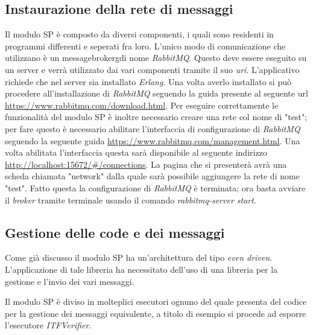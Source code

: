 \subsection{Instaurazione della rete di messaggi}
Il modulo SP è composto da diversi componenti, i quali sono residenti in programmi differenti e seperati fra loro. L'unico modo di comunicazione che utilizzano è un \gls{messagebrokerg}\glsfirstoccur di nome \emph{RabbitMQ}. Questo deve essere eseguito su un server e verrà utilizzato dai vari componenti tramite il suo \emph{uri}.
L'applicativo richiede che nel server sia installato \emph{Erlang}. Una volta averlo installato si può procedere all'installazione di \emph{RabbitMQ} seguendo la guida presente al seguente url \url{https://www.rabbitmq.com/download.html}. Per eseguire correttamente le funzionalità del modulo SP è inoltre necessario creare una rete col nome di "test"; per fare questo è necessario abilitare l'interfaccia di configurazione di \emph{RabbitMQ} seguendo la seguente guida \url{https://www.rabbitmq.com/management.html}.
Una volta abilitata l'interfaccia questa sarà disponibile al seguente indirizzo \url{http://localhost:15672/#/connections}. La pagina che si presenterà avrà una scheda chiamata "network" dalla quale sarà possibile aggiungere la rete di nome "test".
Fatto questa la configurazione di \emph{RabbitMQ} è terminata; ora basta avviare il \emph{broker} tramite terminale usando il comando \emph{rabbitmq-server start}.


\subsection{Gestione delle code e dei messaggi}
Come già discusso il modulo SP ha un'architettura del tipo \emph{even driven}. L'applicazione di tale libreria ha necessitato dell'uso di una libreria per la gestione e l'invio dei vari messaggi.

Il modulo SP è diviso in molteplici esecutori ognuno del quale presenta del codice per la gestione dei messaggi equivalente, a titolo di esempio si procede ad esporre l'esecutore \emph{ITFVerifier}.

